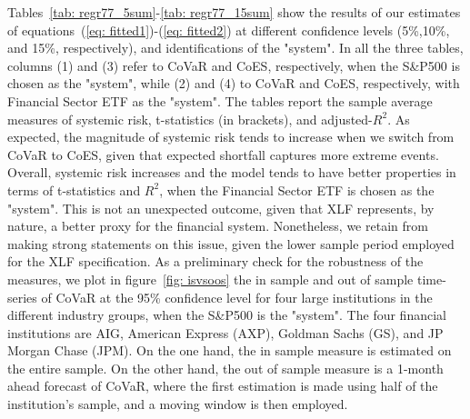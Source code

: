 \documentclass[11pt,a4paper,english]{article}
\begin{document}
Tables~\ref{tab: regr77_5sum}-\ref{tab: regr77_15sum} show the results of our estimates of equations~(\ref{eq: fitted1})-(\ref{eq: fitted2}) at different confidence levels (5\%,10\%, and 15\%, respectively), and identifications of the "system". In all the three tables, columns (1) and (3) refer to CoVaR and CoES, respectively, when the S\&P500 is chosen as the "system", while (2) and (4) to CoVaR and CoES, respectively, with Financial Sector ETF as the "system". The tables report the sample average measures of systemic risk, t-statistics (in brackets), and adjusted-$R^2$. As expected, the magnitude of systemic risk tends to increase when we switch from CoVaR to CoES, given that expected shortfall captures more extreme events. Overall, systemic risk increases and the model tends to have better properties in terms of t-statistics and $R^2$, when the Financial Sector ETF is chosen as the "system". This is not an unexpected outcome, given that XLF represents, by nature, a better proxy for the financial system. Nonetheless, we retain from making strong statements on this issue, given the lower sample period employed for the XLF specification. As a preliminary check for the robustness of the measures, we plot in figure~\ref{fig: isvsoos} the in sample and out of sample time-series of CoVaR at the 95\% confidence level for four large institutions in the different industry groups, when the S\&P500 is the "system". The four financial institutions are AIG, American Express (AXP), Goldman Sachs (GS), and JP Morgan Chase (JPM). On the one hand, the in sample measure is estimated on the entire sample. On the other hand, the out of sample measure is a 1-month ahead forecast of CoVaR, where the first estimation is made using half of the institution's sample, and a moving window is then employed.
\end{document}

